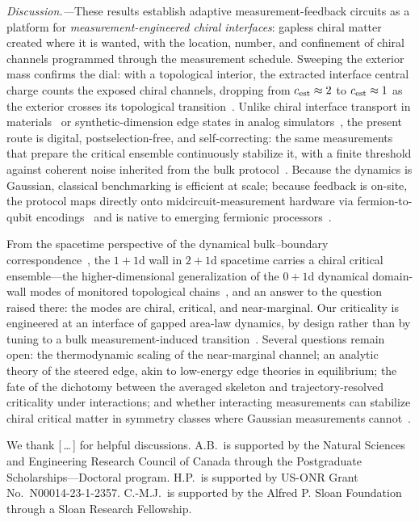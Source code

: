 \documentclass[aps,prl,twocolumn,floatfix,superscriptaddress,nofootinbib]{revtex4-2}
\begin{document}
\emph{Discussion.---}These results establish adaptive measurement-feedback circuits as a platform for \emph{measurement-engineered chiral interfaces}: gapless chiral matter created where it is wanted, with the location, number, and confinement of chiral channels programmed through the measurement schedule.  Sweeping the exterior mass confirms the dial: with a topological interior, the extracted interface central charge counts the exposed chiral channels, dropping from $c_{\rm est}\approx2$ to $c_{\rm est}\approx1$ as the exterior crosses its topological transition~\cite{SM}.  Unlike chiral interface transport in materials~\cite{RosenEtAl2017,UpadhyayaTserkovnyak2016} or synthetic-dimension edge states in analog simulators~\cite{Mancini2015,Stuhl2015}, the present route is digital, postselection-free, and self-correcting: the same measurements that prepare the critical ensemble continuously stabilize it, with a finite threshold against coherent noise inherited from the bulk protocol~\cite{BhuiyanPanJian2026}.  Because the dynamics is Gaussian, classical benchmarking is efficient at scale; because feedback is on-site, the protocol maps directly onto midcircuit-measurement hardware via fermion-to-qubit encodings~\cite{BravyiKitaev2002,Altman2021,Bluvstein2024} and is native to emerging fermionic processors~\cite{GonzalezCuadra2023,Ott2025,Schuckert2024}.

From the spacetime perspective of the dynamical bulk--boundary correspondence~\cite{BhuiyanPanJian2026}, the $1{+}1$d wall in $2{+}1$d spacetime carries a chiral critical ensemble---the higher-dimensional generalization of the $0{+}1$d dynamical domain-wall modes of monitored topological chains~\cite{PanShapourianJian2025}, and an answer to the question raised there: the modes are chiral, critical, and near-marginal.  Our criticality is engineered at an interface of gapped area-law dynamics, by design rather than by tuning to a bulk measurement-induced transition~\cite{AlbertonBuchholdDiehl2021,Fava2023,Poboiko2023,ChahineBuchhold2024}.  Several questions remain open: the thermodynamic scaling of the near-marginal channel; an analytic theory of the steered edge, akin to low-energy edge theories in equilibrium; the fate of the dichotomy between the averaged skeleton and trajectory-resolved criticality under interactions; and whether interacting measurements can stabilize chiral critical matter in symmetry classes where Gaussian measurements cannot~\cite{BhuiyanPanJian2026}.

\begin{acknowledgments}
We thank [\,\dots\,] for helpful discussions.  A.B.\ is supported by the Natural Sciences and Engineering Research Council of Canada through the Postgraduate Scholarships---Doctoral program.  H.P.\ is supported by US-ONR Grant No.\ N00014-23-1-2357.  C.-M.J.\ is supported by the Alfred P. Sloan Foundation through a Sloan Research Fellowship.
\end{acknowledgments}
\end{document}
